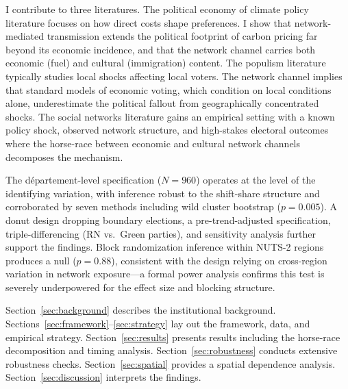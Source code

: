 \documentclass[12pt]{article}
\newcommand{\dept}{d\'{e}partement}
\begin{document}
I contribute to three literatures. The political economy of climate policy literature \citep{douenne2022yellow, klenert2018carbon, stantcheva2022understanding} focuses on how direct costs shape preferences. I show that network-mediated transmission extends the political footprint of carbon pricing far beyond its economic incidence, and that the network channel carries both economic (fuel) and cultural (immigration) content. The populism literature \citep{autor2013china, rodrik2021populism, funke2016going, guiso2019global} typically studies local shocks affecting local voters. The network channel implies that standard models of economic voting, which condition on local conditions alone, underestimate the political fallout from geographically concentrated shocks. The social networks literature \citep{fluckiger2025bro, enikolopov2020social, bailey2018social, chetty2022social1} gains an empirical setting with a known policy shock, observed network structure, and high-stakes electoral outcomes where the horse-race between economic and cultural network channels decomposes the mechanism.

The \dept{}-level specification ($N = 960$) operates at the level of the identifying variation, with inference robust to the shift-share structure \citep{adao2019shift} and corroborated by seven methods including wild cluster bootstrap ($p = 0.005$). A donut design dropping boundary elections, a pre-trend-adjusted specification, triple-differencing (RN vs.\ Green parties), and \citet{rambachan2023more} sensitivity analysis further support the findings. Block randomization inference within NUTS-2 regions produces a null ($p = 0.88$), consistent with the design relying on cross-region variation in network exposure---a formal power analysis confirms this test is severely underpowered for the effect size and blocking structure.

Section~\ref{sec:background} describes the institutional background. Sections~\ref{sec:framework}--\ref{sec:strategy} lay out the framework, data, and empirical strategy. Section~\ref{sec:results} presents results including the horse-race decomposition and timing analysis. Section~\ref{sec:robustness} conducts extensive robustness checks. Section~\ref{sec:spatial} provides a spatial dependence analysis. Section~\ref{sec:discussion} interprets the findings.


\end{document}
